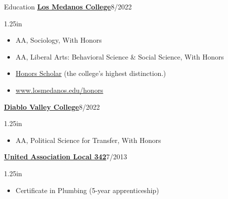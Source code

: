 \documentclass[12pt]{resume} %
\newcommand{\righthandindent}{1.25in}
\begin{document}
\begin{rSection}{Education}
    \textbf{\href{https://www.losmedanos.edu/}{Los Medanos College}}\hfill{}8/2022 
\begin{adjustwidth}{0pt}{\righthandindent}
\vspace{-7pt}
\begin{itemize}
    \item[] AA, Sociology, With Honors
    \vspace{-7pt}
    \item[] AA, Liberal Arts: Behavioral Science \& Social Science, With Honors
    \vspace{-7pt}
    \item[] \href{https://www.losmedanos.edu/honors/prog.aspx\#:~:text=Honors\%20Scholar\%20Requirements}{Honors Scholar} (the college’s highest distinction.)
    \vspace{-7pt}
    \item[] \hspace*{20pt}\href{https://www.losmedanos.edu/honors/prog.aspx\#:~:text=Honors\%20Scholar\%20Requirements}{www.losmedanos.edu/honors}
\end{itemize}

\end{adjustwidth}

    \textbf{\href{https://www.dvc.edu/}{Diablo Valley College}}\hfill{}8/2022
\begin{adjustwidth}{0pt}{\righthandindent}
    \vspace{-7pt}
    \begin{itemize}
        \item[] AA, Political Science for Transfer, With Honors
    \end{itemize}
\end{adjustwidth}

    \href{https://ua342.org/training}{\textbf{United Association Local 342}}\hfill{}7/2013
\begin{adjustwidth}{0pt}{\righthandindent}
    \vspace{-7pt}
    \begin{itemize}
        \item[] Certificate in Plumbing (5-year apprenticeship)
    \end{itemize}
\end{adjustwidth}

\end{rSection}
\end{document}
